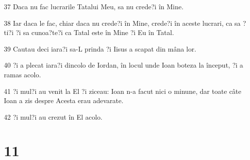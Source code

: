 \par 37 Daca nu fac lucrarile Tatalui Meu, sa nu crede?i în Mine.
\par 38 Iar daca le fac, chiar daca nu crede?i în Mine, crede?i în aceste lucrari, ca sa ?ti?i ?i sa cunoa?te?i ca Tatal este în Mine ?i Eu în Tatal.
\par 39 Cautau deci iara?i sa-L prinda ?i Iisus a scapat din mâna lor.
\par 40 ?i a plecat iara?i dincolo de Iordan, în locul unde Ioan boteza la început, ?i a ramas acolo.
\par 41 ?i mul?i au venit la El ?i ziceau: Ioan n-a facut nici o minune, dar toate câte Ioan a zis despre Acesta erau adevarate.
\par 42 ?i mul?i au crezut în El acolo.

\chapter{11}

